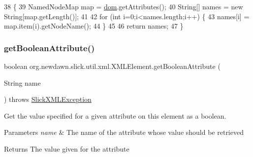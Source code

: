 \begin{DoxyCode}
38                                         \{
39         NamedNodeMap map = \mbox{\hyperlink{classorg_1_1newdawn_1_1slick_1_1util_1_1xml_1_1_x_m_l_element_a97e3ba0c57e0822e9111fd770807e64e}{dom}}.getAttributes();
40         String[] names = \textcolor{keyword}{new} String[map.getLength()];
41         
42         \textcolor{keywordflow}{for} (\textcolor{keywordtype}{int} i=0;i<names.length;i++) \{
43             names[i] = map.item(i).getNodeName();
44         \}
45         
46         \textcolor{keywordflow}{return} names;
47     \}
\end{DoxyCode}
\mbox{\label{classorg_1_1newdawn_1_1slick_1_1util_1_1xml_1_1_x_m_l_element_a36639543c9fa4a8c5a18b46a35e817e9}} 
\subsubsection{\texorpdfstring{get\+Boolean\+Attribute()}{getBooleanAttribute()}\hspace{0.1cm}{\footnotesize\ttfamily [1/2]}}
{\footnotesize\ttfamily boolean org.\+newdawn.\+slick.\+util.\+xml.\+X\+M\+L\+Element.\+get\+Boolean\+Attribute (\begin{DoxyParamCaption}\item[{String}]{name }\end{DoxyParamCaption}) throws \mbox{\hyperlink{classorg_1_1newdawn_1_1slick_1_1util_1_1xml_1_1_slick_x_m_l_exception}{Slick\+X\+M\+L\+Exception}}\hspace{0.3cm}{\ttfamily [inline]}}

Get the value specified for a given attribute on this element as a boolean.


\begin{DoxyParams}{Parameters}
{\em name} & The name of the attribute whose value should be retrieved \\
\hline
\end{DoxyParams}
\begin{DoxyReturn}{Returns}
The value given for the attribute 
\end{DoxyReturn}


